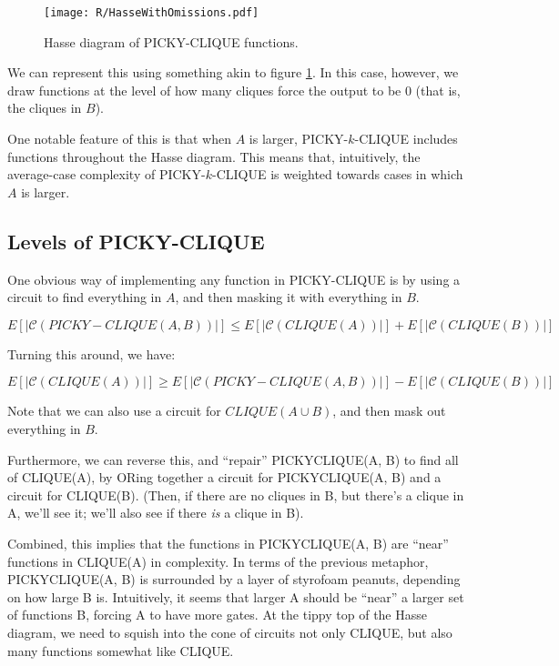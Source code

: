 \documentclass[12pt]{article}
\theoremstyle{definition}
\newcommand{\bigC}[0]{\mathcal{C}}
\begin{document}
\begin{figure}
\centering
\texttt{[image: R/HasseWithOmissions.pdf]}
\caption{Hasse diagram of PICKY-CLIQUE functions. 
}
\label{fig:Hasse}
\end{figure}


We can represent this using something akin
to figure \ref{fig:Hasse}. In this case, however, we
draw functions at the level of how many
cliques force the output to be 0 (that is,
the cliques in $B$).

One notable feature of this is that when $A$ is
larger, PICKY-$k$-CLIQUE includes functions
throughout the Hasse diagram. This means that,
intuitively, the average-case complexity of
PICKY-$k$-CLIQUE is weighted towards cases
in which $A$ is larger.

\subsection{Levels of PICKY-CLIQUE}

One obvious way of implementing any function in PICKY-CLIQUE
is by using a circuit to find everything in $A$, and then
masking it with everything in $B$.

\[
E[|\bigC(PICKY-CLIQUE(A, B))|] \le
E[|\bigC(CLIQUE(A))|] + E[|\bigC(CLIQUE(B))|]
\]

Turning this around, we have:

\[
E[|\bigC(CLIQUE(A))|]
\ge
E[|\bigC(PICKY-CLIQUE(A, B))|] - E[|\bigC(CLIQUE(B))|]
\]

Note that we can also use a circuit for $CLIQUE(A \cup B)$,
and then mask out everything in $B$.

Furthermore, we can reverse this, and ``repair'' 
PICKYCLIQUE(A, B) to find all of CLIQUE(A), by ORing together
a circuit for PICKYCLIQUE(A, B) and a circuit for CLIQUE(B).
(Then, if there are no cliques in B, but there's a clique in A,
we'll see it; we'll also see if there {\em is} a clique in B).

Combined, this implies that the functions in
PICKYCLIQUE(A, B) are ``near'' functions in CLIQUE(A) in
complexity. In terms of the previous metaphor, PICKYCLIQUE(A, B)
is surrounded by a layer of styrofoam peanuts, depending on how
large B is. Intuitively, it seems that larger A should be
``near'' a larger set of functions B, forcing A to have more
gates. At the tippy top of the Hasse diagram, we need to squish
into the cone of circuits not only CLIQUE, but also many functions
somewhat like CLIQUE.
\end{document}
